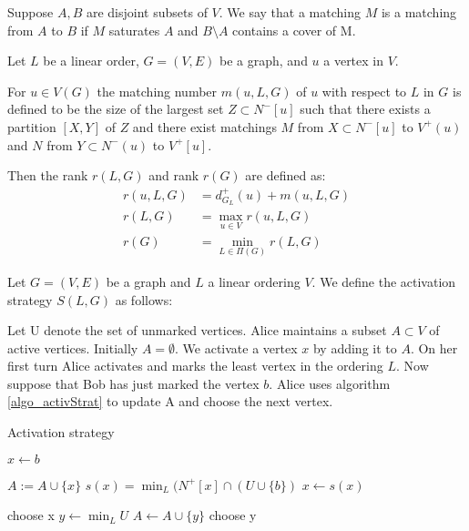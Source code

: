 
\begin{definition} \label{defnRank}
    Suppose $A,B$ are disjoint subsets of $V$. We say that a matching $M$ is a matching from $A$ to $B$ if $M$ saturates $A$ and $B\setminus A$ contains a cover of M. 
    
    Let $L$ be a linear order, $G=(V,E)$ be a graph, and $u$ a vertex in $V$.
        
    For $u \in V(G)$ the matching number $m(u, L, G)$ of $u$ with respect to $L$ in $G$ is defined to be the size of the largest set $Z \subset N^-[u]$ such that there exists a partition $[X, Y]$ of $Z$ and there exist matchings $M$ from
    $X\subset N^-[u]$ to $V^+(u)$ and $N$ from $Y\subset N^-(u)$ to $V^+[u]$.
    
    Then the rank $r(L,G)$ and rank $r(G)$ are defined as:
    \begin{align*}
    	r(u,L,G) & = d^+_{G_L}(u) + m(u,L,G) \\
    	r(L,G)   & = \max_{u \in V}r(u,L,G)  \\
    	r(G)     & = \min_{L \in \Pi(G)} r(L,G)
    \end{align*}
\end{definition}

\begin{definition} 
    Let $G=(V, E)$ be a graph and $L$ a linear ordering $V$. We define the activation strategy $S(L,G)$ as follows:
    
    Let U denote the set of unmarked vertices. Alice maintains a subset $A \subset V$ of active vertices. Initially $A = \emptyset$. We activate a vertex $x$ by adding it to $A$. On her first turn Alice activates and marks the least vertex in the ordering $L$. Now suppose that Bob has just marked the vertex $b$. Alice uses algorithm \ref{algo_activStrat} to update A and choose the
    next vertex.
    \begin{algorithm}[h]
        \caption{Activation strategy}
        \label{algo_activStrat}
        \begin{algorithmic}[1]
            \Statex
            \State $x \gets b$ 
            
                \State $A := A \cup \{x\}$
                \State $s(x) =\min_L(N^+[x] \cap (U \cup \{b\} )$
                \State $x \gets s(x)$
            \EndWhile      
            
                \State choose x
            \Else
                \State $y \gets \min_L U$
                    \State $A \gets A \cup \{y\}$                    
                \EndIf     
                \State choose y
            \EndIf   
        \end{algorithmic}
    \end{algorithm}
    
\end{definition}


